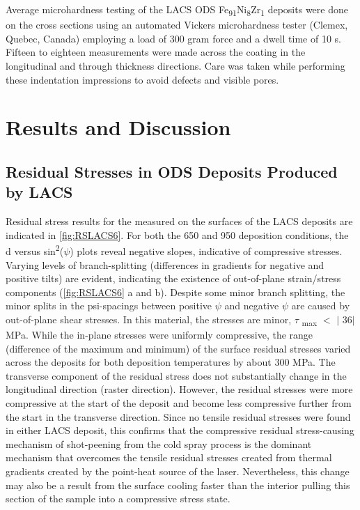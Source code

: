 		Average microhardness testing of the LACS ODS Fe\textsubscript{91}Ni\textsubscript{8}Zr\textsubscript{1} deposits were done on the cross sections using an automated Vickers microhardness tester (Clemex, Quebec, Canada) employing a load of 300 gram force and a dwell time of 10 s. Fifteen to eighteen measurements were made across the coating in the longitudinal and through thickness directions. Care was taken while performing these indentation impressions to avoid defects and visible pores.
	

\section*{Results and Discussion}

	\subsection*{Residual Stresses in ODS Deposits Produced by LACS}
	
	
		Residual stress results for the measured on the surfaces of the LACS deposits are indicated in \ref{fig:RSLACS6}. For both the 650 \celsius{} and 950 \celsius{} deposition conditions, the d versus sin\textsuperscript{2}($\psi$) plots reveal negative slopes, indicative of compressive stresses. Varying levels of branch-splitting (differences in gradients for negative and positive  tilts) are evident, indicating the existence of out-of-plane strain/stress components (\ref{fig:RSLACS6} a and b). Despite some minor branch splitting, \textcolor[HTML]{222222}{the minor splits in the psi-spacings between positive $ \psi $  and negative $ \psi $  are caused by out-of-plane shear stresses. In this material, the stresses are minor, $ \tau$ \textsubscript{max }$<$ $ \vert $ 36$ \vert $  MPa.} While the in-plane stresses were uniformly compressive, the range (difference of the maximum and minimum) of the surface residual stresses varied across the deposits for both deposition temperatures by about 300 MPa. The transverse component of the residual stress does not substantially change in the longitudinal direction (raster direction). However, the residual stresses were more compressive at the start of the deposit and become less compressive further from the start in the transverse direction. Since no tensile residual stresses were found in either LACS deposit, this confirms that the compressive residual stress-causing mechanism of shot-peening from the cold spray process is the dominant mechanism that overcomes the tensile residual stresses created from thermal gradients created by the point-heat source of the laser. Nevertheless, this change may also be a result from the surface cooling faster than the interior pulling this section of the sample into a compressive stress state.
		
